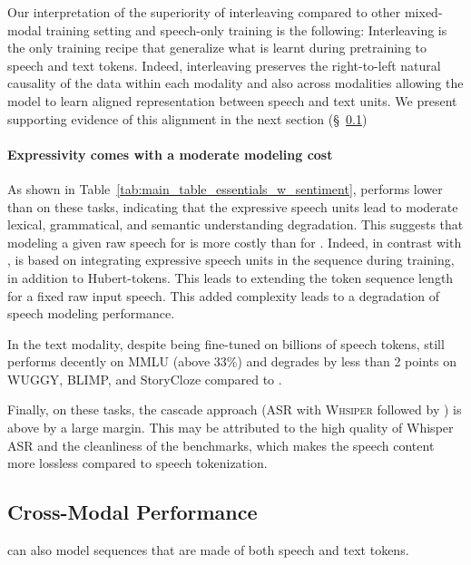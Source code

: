 Our interpretation of the superiority of interleaving compared to other mixed-modal training setting and speech-only training is the following: 
Interleaving is the only training recipe that generalize what is learnt during \llamatwo pretraining to speech and text tokens. Indeed, interleaving preserves the right-to-left natural causality of the data within each modality and also across modalities allowing the model to learn aligned representation between speech and text units. We present supporting evidence of this alignment in the next section (\S~\ref{sec:cross_modal_perf})

\paragraph{Expressivity comes with a moderate modeling cost}
As shown in Table~\ref{tab:main_table_essentials_w_sentiment}, \expressiveVone performs lower than \spotbase on these tasks, indicating that the expressive speech units lead to moderate lexical, grammatical, and semantic understanding degradation. This suggests that modeling a given raw speech for \expressiveVone is more costly than for \spotbase. Indeed, in contrast with \spotbase, \expressiveVone is based on integrating expressive speech units in the sequence during training, in addition to Hubert-tokens. This leads to extending the token sequence length for a fixed raw input speech. This added complexity leads to a degradation of speech modeling performance.

In the text modality, despite being fine-tuned on billions of speech tokens, \spot still performs decently on MMLU (above 33\%) and degrades by less than 2 points on WUGGY, BLIMP, and StoryCloze compared to \llamatwo.

Finally, on these tasks, the cascade approach (ASR with \textsc{Whsiper} followed by \llamatwo) is above \spot by a large margin. This may be attributed to the high quality of Whisper ASR and the cleanliness of the benchmarks, which makes the speech content more lossless compared to speech tokenization.

\subsection{Cross-Modal Performance}
\label{sec:cross_modal_perf}
\spot can also model sequences that are made of both speech and text tokens. 

